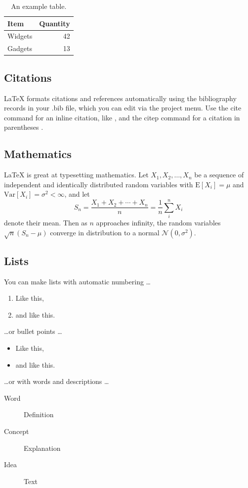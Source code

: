 \documentclass[fleqn,10pt,lineno]{wlpeerj}
\begin{document}
	\begin{table}[ht]
		\centering
		\begin{tabular}{l|r}
			Item & Quantity \\\hline
			Widgets & 42 \\
			Gadgets & 13
		\end{tabular}
		\caption{\label{tab:widgets}An example table.}
	\end{table}
	
	\subsection*{Citations}
	
	LaTeX formats citations and references automatically using the bibliography records in your .bib file, which you can edit via the project menu. Use the cite command for an inline citation, like \cite{Figueredo:2009dg}, and the citep command for a citation in parentheses \citep{Figueredo:2009dg}.
	
	\subsection*{Mathematics}
	
	\LaTeX{} is great at typesetting mathematics. Let $X_1, X_2, \ldots, X_n$ be a sequence of independent and identically distributed random variables with $\text{E}[X_i] = \mu$ and $\text{Var}[X_i] = \sigma^2 < \infty$, and let
	$$S_n = \frac{X_1 + X_2 + \cdots + X_n}{n}
	= \frac{1}{n}\sum_{i}^{n} X_i$$
	denote their mean. Then as $n$ approaches infinity, the random variables $\sqrt{n}(S_n - \mu)$ converge in distribution to a normal $\mathcal{N}(0, \sigma^2)$.
	
	\subsection*{Lists}
	
	You can make lists with automatic numbering \dots
	
	\begin{enumerate}[noitemsep] 
		\item Like this,
		\item and like this.
	\end{enumerate}
	\dots or bullet points \dots
	\begin{itemize}[noitemsep] 
		\item Like this,
		\item and like this.
	\end{itemize}
	\dots or with words and descriptions \dots
	\begin{description}
		\item[Word] Definition
		\item[Concept] Explanation
		\item[Idea] Text
	\end{description}
	
\end{document}
